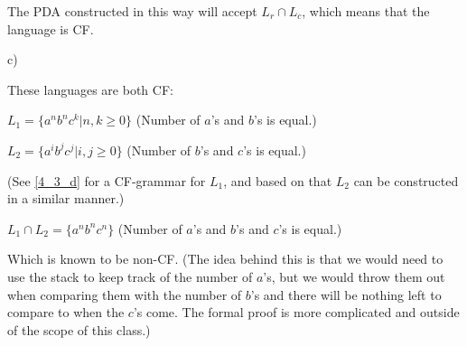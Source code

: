 The PDA constructed in this way will accept $L_r \cap L_c$, which means that the language is CF.

c)

These languages are both CF:

$L_1 = \{a^nb^nc^k | n,k \geq{} 0\}$ (Number of $a$'s and $b$'s is equal.)

$L_2 = \{a^ib^jc^j | i,j \geq{} 0\}$ (Number of $b$'s and $c$'s is equal.)

(See \ref{4_3_d} for a CF-grammar for $L_1$, and based on that $L_2$ can be constructed in a similar manner.)

$L_1 \cap L_2 = \{a^nb^nc^n\}$  (Number of $a$'s and $b$'s and $c$'s is equal.)

Which is known to be non-CF. (The idea behind this is that we would need to use the stack to keep track of the number of $a$'s, but we would throw them out when comparing them with the number of $b$'s and there will be nothing left to compare to when the $c$'s come. The formal proof is more complicated and outside of the scope of this class.)